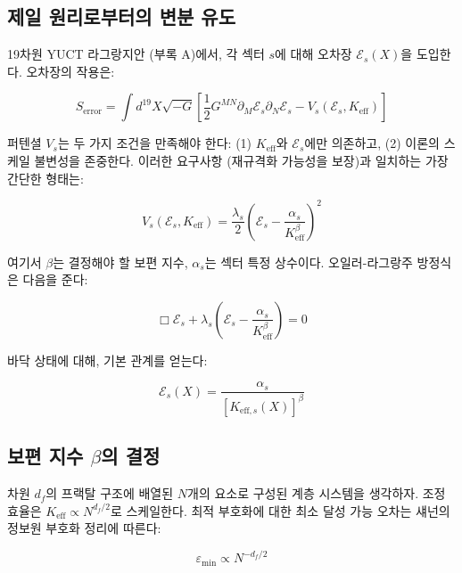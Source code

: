 \documentclass[12pt,a4paper]{article}
\newcommand{\Keff}{K_{\mathrm{eff}}}
\newcommand{\eps}{\varepsilon}
\newcommand{\df}{d_{\!f}}
\theoremstyle{remark}
\begin{document}
	\subsection{제일 원리로부터의 변분 유도}
	
	19차원 YUCT 라그랑지안 (부록 A)에서, 각 섹터 \(s\)에 대해 오차장 \(\mathcal{E}_s(X)\)을 도입한다. 오차장의 작용은:
	
	\begin{equation}
		S_{\text{error}} = \int d^{19}X \sqrt{-G} \left[ \frac{1}{2} G^{MN} \partial_M \mathcal{E}_s \partial_N \mathcal{E}_s - V_s(\mathcal{E}_s, \Keff) \right]
		\label{eq:error-action}
	\end{equation}
	
	퍼텐셜 \(V_s\)는 두 가지 조건을 만족해야 한다: (1) \(\Keff\)와 \(\mathcal{E}_s\)에만 의존하고, (2) 이론의 스케일 불변성을 존중한다. 이러한 요구사항 (재규격화 가능성을 보장)과 일치하는 가장 간단한 형태는:
	
	\begin{equation}
		V_s(\mathcal{E}_s, \Keff) = \frac{\lambda_s}{2} \left( \mathcal{E}_s - \frac{\alpha_s}{\Keff^{\beta}} \right)^2
		\label{eq:error-potential}
	\end{equation}
	
	여기서 \(\beta\)는 결정해야 할 보편 지수, \(\alpha_s\)는 섹터 특정 상수이다. 오일러-라그랑주 방정식은 다음을 준다:
	
	\begin{equation}
		\Box \mathcal{E}_s + \lambda_s \left( \mathcal{E}_s - \frac{\alpha_s}{\Keff^{\beta}} \right) = 0
		\label{eq:error-eom}
	\end{equation}
	
	바닥 상태에 대해, 기본 관계를 얻는다:
	
	\begin{equation}
		\mathcal{E}_s(X) = \frac{\alpha_s}{[K_{\mathrm{eff},s}(X)]^{\beta}}
		\label{eq:error-ground}
	\end{equation}
	
	\subsection{보편 지수 \(\beta\)의 결정}
	
	차원 \(\df\)의 프랙탈 구조에 배열된 \(N\)개의 요소로 구성된 계층 시스템을 생각하자. 조정 효율은 \(\Keff \propto N^{\df/2}\)로 스케일한다. 최적 부호화에 대한 최소 달성 가능 오차는 섀넌의 정보원 부호화 정리에 따른다:
	
	\begin{equation}
		\eps_{\min} \propto N^{-\df/2}
		\label{eq:shannon-bound}
	\end{equation}
	
\end{document}
